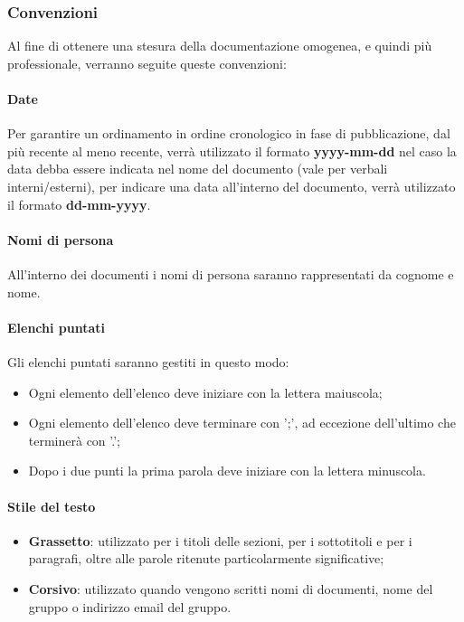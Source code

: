        \subsubsection{Convenzioni}
        Al fine di ottenere una stesura della documentazione omogenea, e quindi più professionale, verranno seguite queste convenzioni:
        \paragraph{Date}
        Per garantire un ordinamento in ordine cronologico in fase di pubblicazione, dal più recente al meno recente, verrà utilizzato il formato \textbf{yyyy-mm-dd} nel caso la data debba essere indicata nel nome del documento (vale per verbali interni/esterni), 
        per indicare una data all'interno del documento, verrà utilizzato il formato \textbf{dd-mm-yyyy}.
        \paragraph{Nomi di persona} 
        All'interno dei documenti i nomi di persona saranno rappresentati da cognome e nome.
        \paragraph{Elenchi puntati}
        Gli elenchi puntati saranno gestiti in questo modo:
        \begin{itemize}
            \item Ogni elemento dell'elenco deve iniziare con la lettera maiuscola;
            \item Ogni elemento dell'elenco deve terminare con ';', ad eccezione dell'ultimo che terminerà con '.';
            \item Dopo i due punti la prima parola deve iniziare con la lettera minuscola.
        \end{itemize}
        \paragraph{Stile del testo}
        \begin{itemize}
            \item \textbf{Grassetto}: utilizzato per i titoli delle sezioni, per i sottotitoli e per i paragrafi, oltre alle parole ritenute particolarmente significative;
            \item \textbf{Corsivo}: utilizzato quando vengono scritti nomi di documenti, nome del gruppo o indirizzo email del gruppo.
        \end{itemize}
